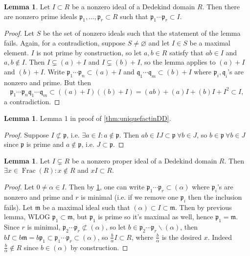 \documentclass{article}
\newcommand{\Frac}{\operatorname{Frac}}
\newcommand{\ip}{\mathfrak{p}}
\newcommand{\iq}{\mathfrak{q}}
\theoremstyle{definition}
\newtheorem{lemma}[defn]{Lemma}
\begin{document}
\begin{lemma}
\label{lemma:almostfact}
Let $I\subset R$ be a nonzero ideal of a Dedekind domain $R$. Then there are nonzero prime ideals $\ip_1,\ldots,\ip_r\subset R$ such that $\ip_1\cdots\ip_r\subset I$.
\end{lemma}
\begin{proof}
Let $S$ be the set of nonzero ideals such that the statement of the lemma fails. Again, for a contradiction, suppose $S\neq\varnothing$ and let $I\in S$ be a maximal element. $I$ is not prime by construction, so let $a,b\in R$ satisfy that $ab\in I$ and $a,b\notin I$. Then $I\subsetneq (a)+I$ and $I\subsetneq (b)+I$, so the lemma applies to $(a)+I$ and $(b)+I$. Write $\ip_1\cdots\ip_n\subset(a)+I$ and $\iq_1\cdots\iq_m\subset(b)+I$ where $\ip_i,\iq_i$'s are nonzero and prime. But then
\[
\ip_1\cdots\ip_n\iq_1\cdots\iq_m\subset((a)+I)((b)+I)=(ab)+(a)I+(b)I+I^2\subset I,
\]
a contradiction.
\end{proof}

\begin{lemma}
Lemma 1 in proof of \ref{thm:uniquefactinDD}.
\end{lemma}
\begin{proof}
Suppose $I\nsubset\ip$, i.e. $\exists a\in I:a\notin\ip$. Then $ab\in IJ\subset\ip \ \forall b\in J$, so $b\in\ip \ \forall b\in J$ since $\ip$ is prime and $a\notin\ip$, i.e. $J\subset\ip$.
\end{proof}

\begin{lemma}
Let $I\subsetneq R$ be a nonzero proper ideal of a Dedekind domain $R$. Then $\exists x\in\Frac(R):x\notin R$ and $xI\subset R$.
\end{lemma}
\begin{proof}
Let $0\neq\alpha\in I$. Then by \ref{lemma:almostfact}, one can write $\ip_1\cdots\ip_r\subset(\alpha)$ where $\ip_i$'s are nonzero and prime and $r$ is minimal (i.e. if we remove one $\ip_i$ then the inclusion fails). Let $\mathfrak m$ be a maximal ideal such that $(\alpha)\subset I\subset\mathfrak m$. Then by previous lemma, WLOG $\ip_1\subset\mathfrak m$, but $\ip_1$ is prime so it's maximal as well, hence $\ip_1=\mathfrak m$. Since $r$ is minimal, $\ip_2\cdots\ip_r\nsubset (\alpha)$, so let $b\in\ip_2\cdots\ip_r\backslash(\alpha)$, then $bI\subset b\mathfrak m=b\ip_1\subset\ip_1\cdots\ip_r\subset(\alpha)$, so $\frac{b}{\alpha}I\subset R$, where $\frac{b}{\alpha}$ is the desired $x$. Indeed $\frac{b}{\alpha}\notin R$ since $b\in(\alpha)$ by construction.
\end{proof}
\end{document}
